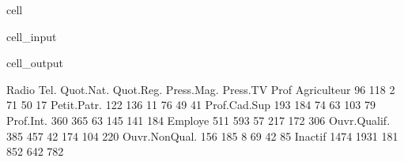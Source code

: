 \documentclass[letterpaper,10pt,french]{sphinxmanual}
\begin{document}
\begin{sphinxuseclass}{cell}
\begin{sphinxuseclass}{cell_input}
\begin{sphinxVerbatim}[commandchars=\\\{\}]
      
\end{sphinxVerbatim}

\end{sphinxuseclass}
\begin{sphinxuseclass}{cell_output}
\begin{sphinxVerbatim}[commandchars=\\\{\}]
                Radio  Tel.  Quot.Nat.  Quot.Reg.  Press.Mag.  Press.TV
Prof                                                                   
Agriculteur        96   118          2         71          50        17
Petit.Patr.       122   136         11         76          49        41
Prof.Cad.Sup      193   184         74         63         103        79
Prof.Int.         360   365         63        145         141       184
Employe           511   593         57        217         172       306
Ouvr.Qualif.      385   457         42        174         104       220
Ouvr.Non\PYGZhy{}Qual.    156   185          8         69          42        85
Inactif          1474  1931        181        852         642       782
\end{sphinxVerbatim}

\end{sphinxuseclass}
\end{sphinxuseclass}
\end{document}

